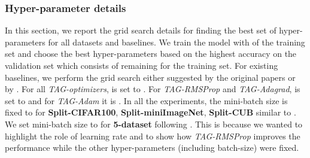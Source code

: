 \documentclass{article} \usepackage{collas2022_conference,times}
\begin{document}
\subsubsection{Hyper-parameter details}\label{hyper} 
In this section, we report the grid search details for finding the best set of hyper-parameters for all datasets and baselines. We train the model with  of the training set and choose the best hyper-parameters based on the highest accuracy on the validation set which consists of remaining  for the training set. For existing baselines, we perform the grid search either suggested by the original papers or by \cite{farajtabar2020orthogonal}. For all \textit{TAG-optimizers},  is set to . For \textit{TAG-RMSProp} and \textit{TAG-Adagrad},  is set to  and for \textit{TAG-Adam} it is . In all the experiments, the mini-batch size is fixed to  for \textbf{Split-CIFAR100}, \textbf{Split-miniImageNet}, \textbf{Split-CUB} similar to \citep{chaudhry2019tiny,mirzadeh2020understanding}. We set mini-batch size to  for \textbf{5-dataset} following \citep{serra2018overcoming}. This is because we wanted to highlight the role of learning rate and to show how \textit{TAG-RMSProp} improves the performance while the other hyper-parameters (including batch-size) were fixed. 
\end{document}
